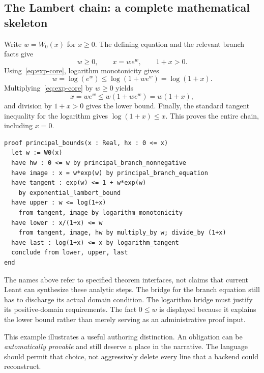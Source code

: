 \documentclass[11pt,a4paper]{article}
\theoremstyle{remark}
\begin{document}
\subsection{The Lambert chain: a complete mathematical skeleton}
Write $w=W_0(x)$ for $x\geq0$. The defining equation and the relevant branch facts give
\[
w\geq0,\qquad x=we^w,\qquad 1+x>0.
\]
Using~\eqref{eq:exp-core}, logarithm monotonicity gives
\[
w=\log(e^w)\leq\log(1+we^w)=\log(1+x).
\]
Multiplying~\eqref{eq:exp-core} by $w\geq0$ yields
\[
x=we^w\leq w(1+we^w)=w(1+x),
\]
and division by $1+x>0$ gives the lower bound. Finally, the standard tangent inequality for the logarithm gives $\log(1+x)\leq x$. This proves the entire chain, including $x=0$.
\par\noindent\begin{minipage}{\linewidth}
\begin{lstlisting}[caption={Proposed high-level presentation of the Lambert chain.}]
proof principal_bounds(x : Real, hx : 0 <= x)
  let w := W0(x)
  have hw : 0 <= w by principal_branch_nonnegative
  have image : x = w*exp(w) by principal_branch_equation
  have tangent : exp(w) <= 1 + w*exp(w)
    by exponential_lambert_bound
  have upper : w <= log(1+x)
    from tangent, image by logarithm_monotonicity
  have lower : x/(1+x) <= w
    from tangent, image, hw by multiply_by w; divide_by (1+x)
  have last : log(1+x) <= x by logarithm_tangent
  conclude from lower, upper, last
end
\end{lstlisting}
\end{minipage}\par
The names above refer to specified theorem interfaces, not claims that current Leant can synthesize these analytic steps. The bridge for the branch equation still has to discharge its actual domain condition. The logarithm bridge must justify its positive-domain requirements. The fact $0\leq w$ is displayed because it explains the lower bound rather than merely serving as an administrative proof input.

This example illustrates a useful authoring distinction. An obligation can be \emph{automatically provable} and still deserve a place in the narrative. The language should permit that choice, not aggressively delete every line that a backend could reconstruct.
\end{document}
